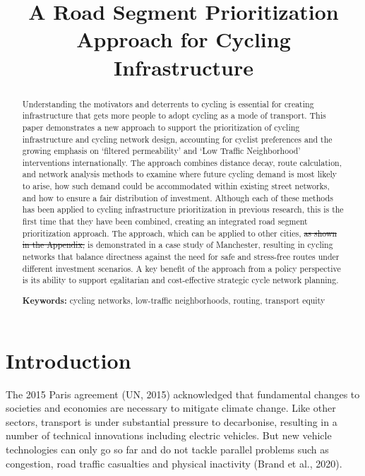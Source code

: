 \documentclass[
]{article}
\title{A Road Segment Prioritization Approach for Cycling Infrastructure}
\author{}
\date{\vspace{-2.5em}}
\providecommand{\DIFdeltex}[1]{{\protect\color{red}\sout{#1}}}                      %
\providecommand{\DIFdelbegin}{} %
\providecommand{\DIFdelend}{} %
\providecommand{\DIFdel}[1]{\texorpdfstring{\DIFdeltex{#1}}{}} %
\newcommand{\DIFscaledelfig}{0.5}
\newlength{\DIFdelgraphicswidth} %
\newlength{\DIFdelgraphicsheight} %
\newcommand{\DIFdelincludegraphics}[2][]{%
\sbox{\DIFdelgraphicsbox}{\DIFOincludegraphics[#1]{#2}}%
\settoboxwidth{\DIFdelgraphicswidth}{\DIFdelgraphicsbox} %
\settoboxtotalheight{\DIFdelgraphicsheight}{\DIFdelgraphicsbox} %
\scalebox{\DIFscaledelfig}{%
\parbox[b]{\DIFdelgraphicswidth}{\usebox{\DIFdelgraphicsbox}\\[-\baselineskip] \rule{\DIFdelgraphicswidth}{0em}}\llap{\resizebox{\DIFdelgraphicswidth}{\DIFdelgraphicsheight}{%
\setlength{\unitlength}{\DIFdelgraphicswidth}%
\begin{picture}(1,1)%
\thicklines\linethickness{2pt} %
{\color[rgb]{1,0,0}\put(0,0){\framebox(1,1){}}}%
{\color[rgb]{1,0,0}\put(0,0){\line( 1,1){1}}}%
{\color[rgb]{1,0,0}\put(0,1){\line(1,-1){1}}}%
\end{picture}%
}\hspace*{3pt}}} %
} %
\DeclareRobustCommand{\DIFdelbegin}{\DIFOdelbegin \let\includegraphics\DIFdelincludegraphics} %
\DeclareRobustCommand{\DIFdelend}{\DIFOaddend \let\includegraphics\DIFOincludegraphics} %
\begin{document}
\maketitle
\begin{abstract}
Understanding the motivators and deterrents to cycling is essential for creating infrastructure that gets more people to adopt cycling as a mode of transport. This paper demonstrates a new approach to support the prioritization of cycling infrastructure and cycling network design, accounting for cyclist preferences and the growing emphasis on `filtered permeability' and `Low Traffic Neighborhood' interventions internationally. The approach combines distance decay, route calculation, and network analysis methods to examine where future cycling demand is most likely to arise, how such demand could be accommodated within existing street networks, and how to ensure a fair distribution of investment. Although each of these methods has been applied to cycling infrastructure prioritization in previous research, this is the first time that they have been combined, creating an integrated road segment prioritization approach. The approach, which can be applied to other cities, \DIFdelbegin \DIFdel{as shown in the Appendix, }\DIFdelend is demonstrated in a case study of Manchester, resulting in cycling networks that balance directness against the need for safe and stress-free routes under different investment scenarios. A key benefit of the approach from a policy perspective is its ability to support egalitarian and cost-effective strategic cycle network planning.

\par

\textbf{Keywords:} cycling networks, low-traffic neighborhoods, routing, transport equity
\end{abstract}

\hypertarget{introduction}{%
\section{Introduction}\label{introduction}}

The 2015 Paris agreement (UN, 2015) acknowledged that
fundamental changes to societies and economies are necessary to mitigate
climate change. Like other sectors, transport is under substantial
pressure to decarbonise, resulting in a number of technical innovations
including electric vehicles. But new vehicle technologies can only go so
far and do not tackle parallel problems such as congestion, road traffic
casualties and physical inactivity (Brand et al., 2020).
\end{document}
